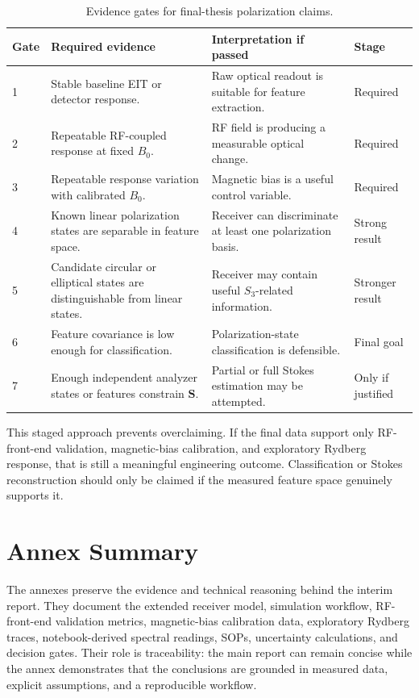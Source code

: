 \documentclass{ieeeaccess}
\begin{document}
\begin{table}[!t]
\caption{Evidence gates for final-thesis polarization claims.}
\label{tab:annex_decision_gates}
\centering
\renewcommand{\arraystretch}{1.12}
\scriptsize
\begin{tabular}{p{} p{} p{} p{}}
\hline
\textbf{Gate} & \textbf{Required evidence} & \textbf{Interpretation if passed} & \textbf{Stage} \\
\hline
1 & Stable baseline EIT or detector response. & Raw optical readout is suitable for feature extraction. & Required \\
2 & Repeatable RF-coupled response at fixed \(B_0\). & RF field is producing a measurable optical change. & Required \\
3 & Repeatable response variation with calibrated \(B_0\). & Magnetic bias is a useful control variable. & Required \\
4 & Known linear polarization states are separable in feature space. & Receiver can discriminate at least one polarization basis. & Strong result \\
5 & Candidate circular or elliptical states are distinguishable from linear states. & Receiver may contain useful \(S_3\)-related information. & Stronger result \\
6 & Feature covariance is low enough for classification. & Polarization-state classification is defensible. & Final goal \\
7 & Enough independent analyzer states or features constrain \(\mathbf{S}\). & Partial or full Stokes estimation may be attempted. & Only if justified \\
\hline
\end{tabular}
\end{table}

This staged approach prevents overclaiming. If the final data support only RF-front-end validation, magnetic-bias calibration, and exploratory Rydberg response, that is still a meaningful engineering outcome. Classification or Stokes reconstruction should only be claimed if the measured feature space genuinely supports it.

\section{Annex Summary}
\label{annex:summary}

The annexes preserve the evidence and technical reasoning behind the interim report. They document the extended receiver model, simulation workflow, RF-front-end validation metrics, magnetic-bias calibration data, exploratory Rydberg traces, notebook-derived spectral readings, SOPs, uncertainty calculations, and decision gates. Their role is traceability: the main report can remain concise while the annex demonstrates that the conclusions are grounded in measured data, explicit assumptions, and a reproducible workflow.

\EOD
\end{document}
